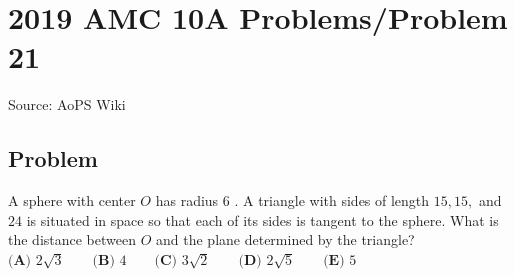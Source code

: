 \documentclass[12pt]{article}
\begin{document}
\section*{{2019 AMC 10A Problems/Problem 21}}
Source: AoPS Wiki

\subsection*{Problem}
A sphere with center $O$ has radius $6$ . A triangle with sides of length $15, 15,$ and $24$ is situated in space so that each of its sides is tangent to the sphere. What is the distance between $O$ and the plane determined by the triangle? $\textbf{(A) }2\sqrt{3}\qquad \textbf{(B) }4\qquad \textbf{(C) }3\sqrt{2}\qquad \textbf{(D) }2\sqrt{5}\qquad \textbf{(E) }5\qquad$
\end{document}
